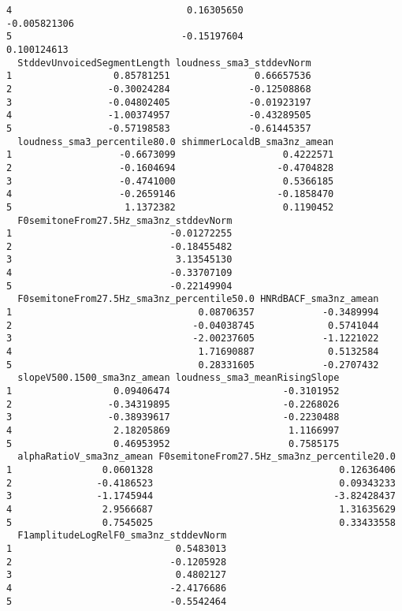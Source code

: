 \documentclass[
  letterpaper,
  DIV=11,
  numbers=noendperiod]{scrartcl}
\begin{document}
\begin{verbatim}
4                               0.16305650                  -0.005821306
5                              -0.15197604                   0.100124613
  StddevUnvoicedSegmentLength loudness_sma3_stddevNorm
1                  0.85781251               0.66657536
2                 -0.30024284              -0.12508868
3                 -0.04802405              -0.01923197
4                 -1.00374957              -0.43289505
5                 -0.57198583              -0.61445357
  loudness_sma3_percentile80.0 shimmerLocaldB_sma3nz_amean
1                   -0.6673099                   0.4222571
2                   -0.1604694                  -0.4704828
3                   -0.4741000                   0.5366185
4                   -0.2659146                  -0.1858470
5                    1.1372382                   0.1190452
  F0semitoneFrom27.5Hz_sma3nz_stddevNorm
1                            -0.01272255
2                            -0.18455482
3                             3.13545130
4                            -0.33707109
5                            -0.22149904
  F0semitoneFrom27.5Hz_sma3nz_percentile50.0 HNRdBACF_sma3nz_amean
1                                 0.08706357            -0.3489994
2                                -0.04038745             0.5741044
3                                -2.00237605            -1.1221022
4                                 1.71690887             0.5132584
5                                 0.28331605            -0.2707432
  slopeV500.1500_sma3nz_amean loudness_sma3_meanRisingSlope
1                  0.09406474                    -0.3101952
2                 -0.34319895                    -0.2268026
3                 -0.38939617                    -0.2230488
4                  2.18205869                     1.1166997
5                  0.46953952                     0.7585175
  alphaRatioV_sma3nz_amean F0semitoneFrom27.5Hz_sma3nz_percentile20.0
1                0.0601328                                 0.12636406
2               -0.4186523                                 0.09343233
3               -1.1745944                                -3.82428437
4                2.9566687                                 1.31635629
5                0.7545025                                 0.33433558
  F1amplitudeLogRelF0_sma3nz_stddevNorm
1                             0.5483013
2                            -0.1205928
3                             0.4802127
4                            -2.4176686
5                            -0.5542464


\end{verbatim}
\end{document}
